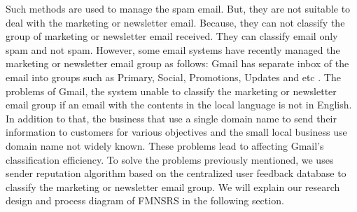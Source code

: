 \documentclass[conference]{IEEEtran}
\begin{document}
Such methods are used to manage the spam email.
But, they are not suitable to deal with the marketing or newsletter email. 
Because, they can not classify the group of marketing or newsletter email received. They can classify email only spam and not spam.
However, some email systems have recently managed the marketing or newsletter email group as follows: Gmail has separate inbox of the email into groups such as Primary, Social, Promotions, Updates and etc \cite{gmail}.
The problems of Gmail, the system unable to classify the marketing or newsletter email group if an email with the contents in the local language is not in English.
In addition to that, the business that use a single domain name to send their information to customers for various objectives and the small local business use domain name not widely known.
These problems lead to affecting Gmail's classification efficiency.
To solve the problems previously mentioned, we uses sender reputation algorithm based on the centralized user feedback database to classify the marketing or newsletter email group.
We will explain our research design and process diagram of FMNSRS in the following section.

\end{document}
